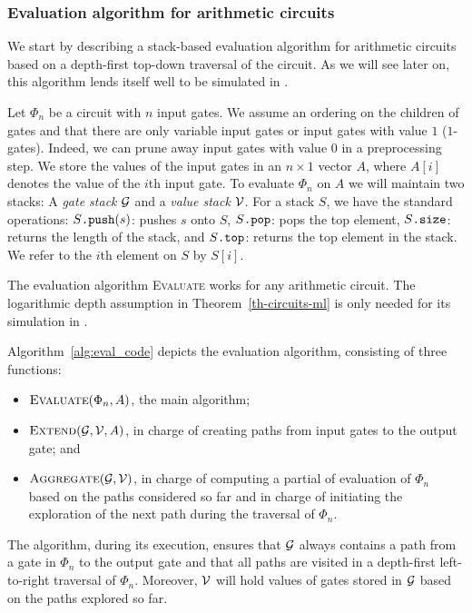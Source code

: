 \subsubsection{Evaluation algorithm for arithmetic circuits}\label{subsubsec:eval}
We start by describing a stack-based evaluation algorithm for arithmetic circuits based on a depth-first top-down traversal of the circuit. As we will see later on, this algorithm lends itself well to be simulated in \langfor. 

Let $\Phi_n$ be a circuit with $n$ input gates. We assume an ordering on the children of gates and that there are only variable input gates or input gates with value $1$ ($1$-gates). Indeed, we can prune away input gates with value $0$ in a preprocessing step. We store the values of the input gates in an $n\times 1$ vector $A$, where $A[i]$ denotes the value
of the $i$th input gate. To evaluate $\Phi_n$ on $A$ we will maintain two stacks: A \textit{gate stack}
 $\mathcal{G}$ and a \textit{value stack} $\mathcal{V}$. For a stack $S$, we have the standard operations: $S\texttt{.push}(s)$: pushes $s$ onto $S$,
$S\texttt{.pop}$: pops the top element,  $S\texttt{.size}$: returns the length of the stack, and
$S\texttt{.top}$: returns the top element in the stack. We refer to the $i$th element on $S$ by $S[i]$.

The evaluation algorithm \textsc{Evaluate} works for any arithmetic circuit. The logarithmic depth assumption in Theorem~\ref{th-circuits-ml} is only needed for its simulation in \langfor.

Algorithm~\ref{alg:eval_code} depicts the evaluation algorithm, consisting of three functions:
\begin{itemize}
\item $\textsc{Evaluate}(\Phi_n,A)$, the main algorithm; 
\item $\textsc{Extend}(\mathcal{G},\mathcal{V},A)$, in charge of creating paths from input gates to the output gate; and 
\item $\textsc{Aggregate}(\mathcal{G},\mathcal{V})$, in charge of computing a partial of evaluation of $\Phi_n$ based on the paths considered so far and in charge of initiating the exploration of the next path during the traversal of $\Phi_n$.
\end{itemize}
The algorithm, during its execution, ensures that 
$\mathcal{G}$ always contains a path from a gate in $\Phi_n$ to the output gate and that all paths are visited in a depth-first left-to-right traversal of $\Phi_n$. Moreover, $\mathcal{V}$ will hold values of gates stored in $\mathcal{G}$ based on the paths explored so far.


